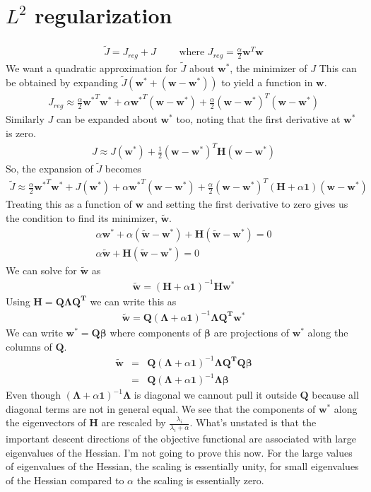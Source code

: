\documentclass{article}
\newcommand{\ber}{\begin{eqnarray}}
\newcommand{\eer}{\end{eqnarray}}
\begin{document}
\section{$L^2$ regularization}
\ber
\tilde{J} = J_{reg} + J  \qquad \text{ where } J_{reg} = \frac{\alpha}{2}\pmb{w}^T\pmb{w}
\eer
We want a quadratic approximation for $\tilde{J}$ about $\pmb{w}^{*}$, the minimizer of $J$  This can be obtained by expanding $\tilde{J}(\pmb{w}^{*}+(\pmb{w}-\pmb{w}^{*}))$ to yield a function in $\pmb{w}$.
\ber
J_{reg} \approx \frac{\alpha}{2}\pmb{w^*}^T\pmb{w^*} + \alpha\pmb{w^*}^T(\pmb{w}-\pmb{w^*}) + \frac{\alpha}{2}(\pmb{w}-\pmb{w^*})^T(\pmb{w}-\pmb{w^*})
\eer
Similarly $J$ can be expanded about $\pmb{w^*}$ too, noting that the first derivative at $\pmb{w^*}$ is zero.
\ber
J \approx  J(\pmb{w^*}) + \frac{1}{2}(\pmb{w}-\pmb{w^*})^T\pmb{H}(\pmb{w}-\pmb{w^*})
\eer
So, the expansion of $\tilde{J}$ becomes
\ber
\tilde{J} \approx  \frac{\alpha}{2}\pmb{w^*}^T\pmb{w^*} + J(\pmb{w^*}) + \alpha\pmb{w^*}^T(\pmb{w}-\pmb{w^*}) + \frac{\alpha}{2}(\pmb{w}-\pmb{w^*})^T(\pmb{H}+\alpha\pmb{1})(\pmb{w}-\pmb{w^*})
\eer
Treating this as a function of $\pmb{w}$ and setting the first derivative to zero gives us the condition to find its minimizer, $\pmb{\tilde{w}}$.
\ber
\alpha\pmb{w^*} + \alpha(\pmb{\tilde{w}}-\pmb{w^*}) + \pmb{H}(\pmb{\tilde{w}}-\pmb{w^*}) = 0\\
\alpha\pmb{\tilde{w}} + \pmb{H}(\pmb{\tilde{w}}-\pmb{w^*}) = 0
\eer
We can solve for $\pmb{\tilde{w}}$ as
\ber
\pmb{\tilde{w}} = (\pmb{H}+\alpha\pmb{1})^{-1}\pmb{H}\pmb{w^*}
\eer
Using $\pmb{H}=\pmb{Q}\pmb{\Lambda}\pmb{Q^T}$ we can write this as
\ber
\pmb{\tilde{w}} = \pmb{Q}(\pmb{\Lambda}+\alpha\pmb{1})^{-1}\pmb{\Lambda}\pmb{Q^T}\pmb{w^*}
\eer
We can write $\pmb{w^*}=\pmb{Q}\pmb{\beta}$ where components of $\pmb{\beta}$ are projections of $\pmb{w^*}$ along the columns of $\pmb{Q}$.
\ber
\pmb{\tilde{w}} &=& \pmb{Q}(\pmb{\Lambda}+\alpha\pmb{1})^{-1}\pmb{\Lambda}\pmb{Q^T}\pmb{Q}\pmb{\beta}\\
&=& \pmb{Q}(\pmb{\Lambda}+\alpha\pmb{1})^{-1}\pmb{\Lambda}\pmb{\beta}
\eer
Even though $(\pmb{\Lambda}+\alpha\pmb{1})^{-1}\pmb{\Lambda}$ is diagonal we cannout pull it outside $ \pmb{Q}$ because all diagonal terms are not in general equal. We see that the components of $\pmb{w^*}$ along the eigenvectors of $\pmb{H}$ are rescaled by $\frac{\lambda_i}{\lambda_i + \alpha}$. What's unstated is that the important descent directions of the objective functional are associated with large eigenvalues of the Hessian. I'm not going to prove this now. For the large values of eigenvalues of the Hessian, the scaling is essentially unity, for small eigenvalues of the Hessian compared to $\alpha$ the scaling is essentially zero.\\
\end{document}
